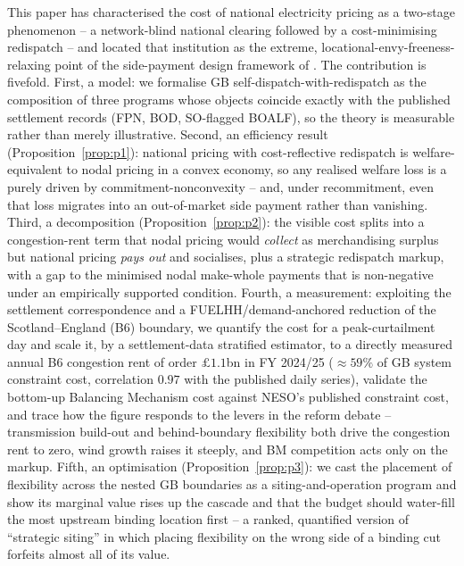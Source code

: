 \documentclass[review,3p,times]{elsarticle}
\theoremstyle{plain}
\theoremstyle{definition}
\begin{document}
This paper has characterised the cost of national electricity pricing as a
two-stage phenomenon -- a network-blind national clearing followed by a
cost-minimising redispatch -- and located that institution as the extreme,
locational-envy-freeness-relaxing point of the side-payment design framework of
\citet{bichler2022}. The contribution is fivefold. First, a model: we formalise
GB self-dispatch-with-redispatch as the composition of three programs whose
objects coincide exactly with the published settlement records (FPN, BOD,
SO-flagged BOALF), so the theory is measurable rather than merely illustrative.
Second, an efficiency result (Proposition~\ref{prop:p1}): national pricing with
cost-reflective redispatch is welfare-equivalent to nodal pricing in a convex
economy, so any realised welfare loss is a purely driven by commitment-nonconvexity
-- and, under recommitment, even that loss migrates into an out-of-market
side payment rather than vanishing. Third, a decomposition
(Proposition~\ref{prop:p2}): the visible cost splits into a congestion-rent term
that nodal pricing would \emph{collect} as merchandising surplus but national
pricing \emph{pays out} and socialises, plus a strategic redispatch markup, with
a gap to the minimised nodal make-whole payments that is non-negative under an
empirically supported condition. Fourth, a measurement: exploiting the
settlement correspondence and a FUELHH/demand-anchored reduction of the
Scotland--England (B6) boundary, we quantify the cost for a peak-curtailment day
and scale it, by a settlement-data stratified estimator, to a directly measured
annual B6 congestion rent of order $\pounds1.1$bn in FY 2024/25 ($\approx59\%$ of
GB system constraint cost, correlation $0.97$ with the published daily series),
validate the bottom-up Balancing Mechanism cost against NESO's published
constraint cost, and trace how the figure responds to the levers in the reform
debate -- transmission build-out and behind-boundary flexibility both drive the
congestion rent to zero, wind growth raises it steeply, and BM competition acts
only on the markup. Fifth, an optimisation (Proposition~\ref{prop:p3}): we cast
the placement of flexibility across the nested GB boundaries as a
siting-and-operation program and show its marginal value rises up the cascade and
that the budget should water-fill the most upstream binding location first -- a
ranked, quantified version of ``strategic siting'' in which placing flexibility on
the wrong side of a binding cut forfeits almost all of its value.
\end{document}
